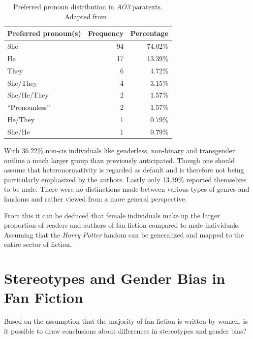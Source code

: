 \begin{table}[ht]
    \centering
    \begin{tabular}{lrr}
        \toprule
        \textbf{Preferred pronoun(s)} & \textbf{Frequency} & \textbf{Percentage} \\
        \midrule
        She                           & 94                 & 74.02\%             \\
        He                            & 17                 & 13.39\%             \\
        They                          & 6                  & 4.72\%              \\
        She/They                      & 4                  & 3.15\%              \\
        She/He/They                   & 2                  & 1.57\%              \\
        ``Pronounless''               & 2                  & 1.57\%              \\
        He/They                       & 1                  & 0.79\%              \\
        She/He                        & 1                  & 0.79\%              \\
        \bottomrule
    \end{tabular}
    \caption[Preferred pronoun distribution in \emph{AO3} paratexts.]{Preferred pronoun distribution in \emph{AO3} paratexts.
    Adapted from \citet[Table~2]{Duggan2020WhoAO3}.}
    \label{tab:duggan_2020_pronouns}
\end{table}
With 36.22\% non-cis individuals like genderless, non-binary and transgender outline a much larger group than previously anticipated.
Though one should assume that heteronormativity is regarded as default and is therefore not being particularly emphasized by the authors.
Lastly only 13.39\% reported themselves to be male.
There were no distinctions made between various types of genres and fandoms and rather viewed from a more general perspective.

From this it can be deduced that female individuals make up the larger proportion of readers and authors of fan fiction compared to male individuals.
Assuming that the \emph{Harry Potter} fandom can be generalized and mapped to the entire sector of fiction.


\section{Stereotypes and Gender Bias in Fan Fiction}\label{sec:stereotypes-and-gender-bias-in-fan-fiction}
Based on the assumption that the majority of fan fiction is written by women, is it possible to draw conclusions about differences in stereotypes and gender bias?

